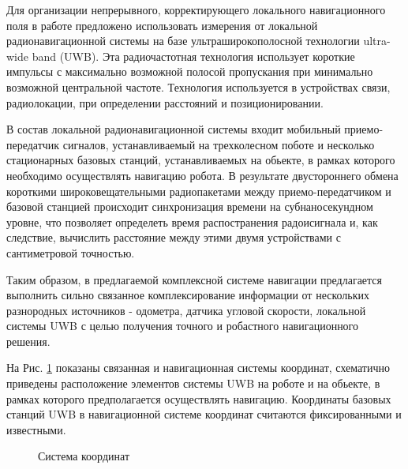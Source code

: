 \documentclass[14pt]{article}
\begin{document}
Для организации непрерывного, корректирующего локального навигационного поля в работе предложено использовать измерения от локальной радионавигационной системы на базе ультраширокополосной технологии ultra-wide band (UWB). Эта радиочастотная технология использует короткие импульсы с максимально возможной полосой пропускания при минимально возможной центральной частоте. Технология используется в устройствах связи, радиолокации, при определении расстояний и позиционировании.

В состав локальной радионавигационной системы входит мобильный приемо-передатчик сигналов, устанавливаемый на трехколесном поботе и несколько стационарных базовых станций, устанавливаемых на обьекте, в рамках которого необходимо осуществлять навигацию робота. В результате двустороннего обмена короткими широковещательными радиопакетами между приемо-передатчиком и базовой станцией происходит синхронизация времени на субнаносекундном уровне, что позволяет определеть время распостранения радоисигнала и, как следствие, вычислить расстояние между этими двумя устройствами с сантиметровой точностью. 

Таким образом, в предлагаемой комплексной системе навигации предлагается выполнить сильно связанное комплексирование информации от нескольких разнородных источников - одометра, датчика угловой скорости, локальной системы UWB с целью получения точного и робастного навигационного решения.

На Рис. \ref{fig:uwb_intergated_axes} показаны связанная и навигационная системы координат, схематично приведены расположение элементов системы UWB на роботе и на обьекте, в рамках которого предполагается осуществлять навигацию. Координаты базовых станций UWB в навигационной системе координат считаются фиксированными и известными. 

\begin{figure}
\noindent{}
\caption{Система координат}
\label{fig:uwb_intergated_axes}
\end{figure}
\end{document}
